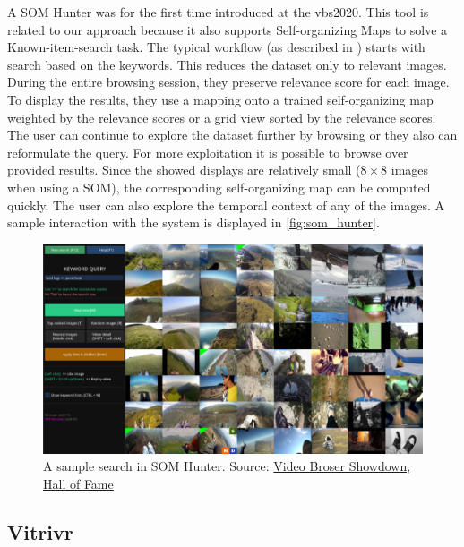 A SOM Hunter was for the first time introduced at the \acrshort{vbs}2020. This tool is related to our approach because it also supports Self-organizing Maps to solve a Known-item-search task. The typical workflow (as described in \cite{kratochvil2020som}) starts with search based on the keywords. This reduces the dataset only to relevant images. During the entire browsing session, they preserve relevance score for each image. To display the results, they use a mapping onto a trained self-organizing map weighted by the relevance scores or a grid view sorted by the relevance scores. The user can continue to explore the dataset further by browsing or they also can reformulate the query. For more exploitation it is possible to browse over provided results. Since the showed displays are relatively small ($8\times8$ images when using a SOM), the corresponding self-organizing map can be computed quickly. The user can also explore the temporal context of any of the images. A sample interaction with the system is displayed in \autoref{fig:som_hunter}.


\begin{figure}
    \centering
    \includegraphics[width=0.99\linewidth]{img/som_hunter_small.png}
    \caption{A sample search in SOM Hunter. Source: \href{https://videobrowsershowdown.org/hall-of-fame/}{Video Broser Showdown, Hall of Fame}}
    \label{fig:som_hunter}
\end{figure}

\subsection{Vitrivr}

